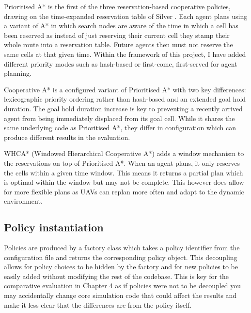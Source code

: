 \vspace{1em}

Prioritised A* is the first of the three reservation-based cooperative policies, drawing on the time-expanded reservation table of Silver \cite{silver2005cooperative}. Each agent plans using a variant of A* in which search nodes are aware of the time in which a cell has been reserved as instead of just reserving their current cell they stamp their whole route into a reservation table. Future agents then must not reserve the same cells at that given time. Within the framework of this project, I have added different priority modes such as hash-based or first-come, first-served for agent planning. \par

\vspace{1em}

Cooperative A* is a configured variant of Prioritised A* with two key differences: lexicographic priority ordering rather than hash-based and an extended goal hold duration. The goal hold duration increase is key to preventing a recently arrived agent from being immediately displaced from its goal cell. While it shares the same underlying code as Prioritised A*, they differ in configuration which can produce different results in the evaluation.\par

\vspace{1em}

WHCA* (Windowed Hierarchical Cooperative A*) adds a window mechanism to the reservations on top of Prioritised A*. When an agent plans, it only reserves the cells within a given time window. This means it returns a partial plan which is optimal within the window but may not be complete. This however does allow for more flexible plans as UAVs can replan more often and adapt to the dynamic environment.\par

\vspace{1em}

\subsection{Policy instantiation}

Policies are produced by a factory class which takes a policy identifier from the configuration file and returns the corresponding policy object. This decoupling allows for policy choices to be hidden by the factory and for new policies to be easily added without modifying the rest of the codebase. This is key for the comparative evaluation in Chapter 4 as if policies were not to be decoupled you may accidentally change core simulation code that could affect the results and make it less clear that the differences are from the policy itself.\par

